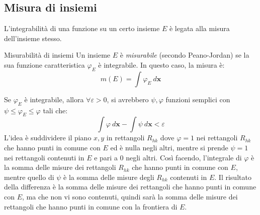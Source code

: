 \documentclass[10pt, a4paper]{scrartcl}
\theoremstyle{definition}
\numberwithin{esempio}{section}
\theoremstyle{definition}
\numberwithin{obs}{section}
\numberwithin{nota}{section}
\numberwithin{equation}{subsection}
\begin{document}
\subsection{Misura di insiemi}
L'integrabilit\`a di una funzione su un certo insieme $E$ \`e legata alla misura dell'insieme stesso.
\begin{definizione}
	{Misurabilit\`a di insiemi}{}
	Un insieme $E$ \`e \textit{misurabile} (secondo Peano-Jordan) se la sua funzione caratteristica $\varphi _E$ \`e integrabile. In questo caso, la misura \`e:
	\begin{equation*}
		m(E) = \int \varphi _E \ d\mathbf{x} 
	\end{equation*}
\end{definizione}
\noindent Se $\varphi _E$ \`e integrabile, allora $\forall \varepsilon >0$, si avrebbero $\psi ,\varphi $ funzioni semplici con $\psi \le  \varphi _E \le \varphi $ tali che:
\[
\int \varphi  \ d\mathbf{x}  - \int \psi \ d\mathbf{x} < \varepsilon 
\] 
L'idea \`e suddividere il piano $x,y$ in rettangoli $R_{hk} $ dove $\varphi =1$ nei rettangoli $R_{hk} $ che hanno punti in comune con $E$ ed \`e nulla negli altri, mentre si prende $\psi =1 $ nei rettangoli contenuti in $E$ e pari a $0$ negli altri. Cos\`i facendo, l'integrale di $\varphi $ \`e la somma delle misure dei rettangoli $R_{hk}$ che hanno punti in comune con $E$, mentre quello di $\psi $ \`e la somma delle misure degli $R_{hk} $ contenuti in $E$. Il risultato della differenza \`e la somma delle misure dei rettangoli che hanno punti in comune con $E$, ma che non vi sono contenuti, quindi sar\`a la somma delle misure dei rettangoli che hanno punti in comune con la frontiera di $E$.
\end{document}
